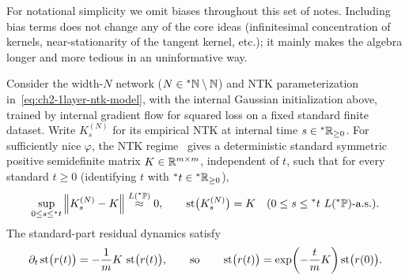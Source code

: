 \begin{remark}\label{rem:ch2-biases}
For notational simplicity we omit biases throughout this set of notes. Including bias terms does not change any of the core ideas (infinitesimal concentration of kernels, near-stationarity of the tangent kernel, etc.); it mainly makes the algebra longer and more tedious in an uninformative way.
\end{remark}

\begin{theorem}\label{thm:ch2-1layer-ntk-thm}
Consider the width-$N$ network ($N \in {}^*\mathbb{N} \setminus \mathbb{N}$) and NTK parameterization in~\eqref{eq:ch2-1layer-ntk-model}, with the internal Gaussian initialization above, trained by internal gradient flow for squared loss on a fixed standard finite dataset. Write $K_s^{(N)}$ for its empirical NTK at internal time $s \in {}^*\mathbb{R}_{\ge 0}$. For sufficiently nice $\varphi$, the NTK regime~\cite{jacot2018neural,lee2019wide} gives a deterministic standard symmetric positive semidefinite matrix $K \in \mathbb{R}^{m \times m}$, independent of $t$, such that for every standard $t \ge 0$ (identifying $t$ with ${}^*t \in {}^*\mathbb{R}_{\ge 0}$),
\begin{equation}\label{eq:ch2-1layer-ntk-conc}
\sup_{0 \le s \le {}^*t} \left\lVert K_s^{(N)} - K \right\rVert \stackrel{L({}^*\mathbb{P})}{\approx} 0, \qquad
\operatorname{st}\bigl(K_s^{(N)}\bigr) = K \quad (0 \le s \le {}^*t \text{ $L({}^*\mathbb{P})$-a.s.}).
\end{equation}
The standard-part residual dynamics satisfy
\begin{equation}\label{eq:ch2-1layer-ntk-res-ode}
\partial_t \operatorname{st}\bigl(r(t)\bigr) = -\frac{1}{m} K \, \operatorname{st}\bigl(r(t)\bigr), \qquad \text{so} \qquad \operatorname{st}\bigl(r(t)\bigr) = \exp\!\left(-\frac{t}{m} K\right)\operatorname{st}\bigl(r(0)\bigr).
\end{equation}
\end{theorem}

